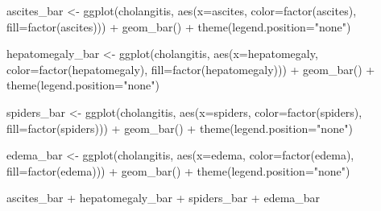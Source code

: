 \documentclass[
]{article}
\newenvironment{Shaded}{\begin{snugshade}}{\end{snugshade}}
\newcommand{\AttributeTok}[1]{\textcolor[rgb]{0.77,0.63,0.00}{#1}}
\newcommand{\FunctionTok}[1]{\textcolor[rgb]{0.00,0.00,0.00}{#1}}
\newcommand{\NormalTok}[1]{#1}
\newcommand{\OtherTok}[1]{\textcolor[rgb]{0.56,0.35,0.01}{#1}}
\newcommand{\SpecialCharTok}[1]{\textcolor[rgb]{0.00,0.00,0.00}{#1}}
\newcommand{\StringTok}[1]{\textcolor[rgb]{0.31,0.60,0.02}{#1}}
\begin{document}
\begin{Shaded}
\begin{Highlighting}[]
\NormalTok{ascites\_bar }\OtherTok{\textless{}{-}} \FunctionTok{ggplot}\NormalTok{(cholangitis, }\FunctionTok{aes}\NormalTok{(}\AttributeTok{x=}\NormalTok{ascites, }\AttributeTok{color=}\FunctionTok{factor}\NormalTok{(ascites), }\AttributeTok{fill=}\FunctionTok{factor}\NormalTok{(ascites))) }\SpecialCharTok{+}
  \FunctionTok{geom\_bar}\NormalTok{() }\SpecialCharTok{+} 
  \FunctionTok{theme}\NormalTok{(}\AttributeTok{legend.position=}\StringTok{"none"}\NormalTok{)}

\NormalTok{hepatomegaly\_bar }\OtherTok{\textless{}{-}} \FunctionTok{ggplot}\NormalTok{(cholangitis, }\FunctionTok{aes}\NormalTok{(}\AttributeTok{x=}\NormalTok{hepatomegaly, }\AttributeTok{color=}\FunctionTok{factor}\NormalTok{(hepatomegaly), }\AttributeTok{fill=}\FunctionTok{factor}\NormalTok{(hepatomegaly))) }\SpecialCharTok{+}
  \FunctionTok{geom\_bar}\NormalTok{() }\SpecialCharTok{+} 
  \FunctionTok{theme}\NormalTok{(}\AttributeTok{legend.position=}\StringTok{"none"}\NormalTok{)}

\NormalTok{spiders\_bar }\OtherTok{\textless{}{-}} \FunctionTok{ggplot}\NormalTok{(cholangitis, }\FunctionTok{aes}\NormalTok{(}\AttributeTok{x=}\NormalTok{spiders, }\AttributeTok{color=}\FunctionTok{factor}\NormalTok{(spiders), }\AttributeTok{fill=}\FunctionTok{factor}\NormalTok{(spiders))) }\SpecialCharTok{+}
  \FunctionTok{geom\_bar}\NormalTok{() }\SpecialCharTok{+} 
  \FunctionTok{theme}\NormalTok{(}\AttributeTok{legend.position=}\StringTok{"none"}\NormalTok{)}

\NormalTok{edema\_bar }\OtherTok{\textless{}{-}} \FunctionTok{ggplot}\NormalTok{(cholangitis, }\FunctionTok{aes}\NormalTok{(}\AttributeTok{x=}\NormalTok{edema, }\AttributeTok{color=}\FunctionTok{factor}\NormalTok{(edema), }\AttributeTok{fill=}\FunctionTok{factor}\NormalTok{(edema))) }\SpecialCharTok{+}
  \FunctionTok{geom\_bar}\NormalTok{() }\SpecialCharTok{+} 
  \FunctionTok{theme}\NormalTok{(}\AttributeTok{legend.position=}\StringTok{"none"}\NormalTok{)}

\NormalTok{ascites\_bar }\SpecialCharTok{+}\NormalTok{ hepatomegaly\_bar }\SpecialCharTok{+}\NormalTok{ spiders\_bar }\SpecialCharTok{+}\NormalTok{ edema\_bar}
\end{Highlighting}
\end{Shaded}
\end{document}
